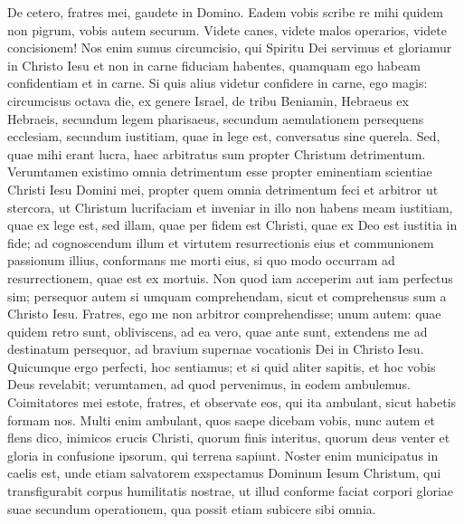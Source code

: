 \begin{biblechapter}  
\verse De cetero, fratres mei, gaudete in Domino. Eadem vobis scribe re mihi quidem non pigrum, vobis autem securum. 
\verse Videte canes, videte malos operarios, videte concisionem! 
\verse Nos enim sumus circumcisio, qui Spiritu Dei servimus et gloriamur in Christo Iesu et non in carne fiduciam habentes, 
\verse quamquam ego habeam confidentiam et in carne. Si quis alius videtur confidere in carne, ego magis: 
\verse circumcisus octava die, ex genere Israel, de tribu Beniamin, Hebraeus ex Hebraeis, secundum legem pharisaeus, 
\verse secundum aemulationem persequens ecclesiam, secundum iustitiam, quae in lege est, conversatus sine querela. 
\verse Sed, quae mihi erant lucra, haec arbitratus sum propter Christum detrimentum. 
\verse Verumtamen existimo omnia detrimentum esse propter eminentiam scientiae Christi Iesu Domini mei, propter quem omnia detrimentum feci et arbitror ut stercora, ut Christum lucrifaciam 
\verse et inveniar in illo non habens meam iustitiam, quae ex lege est, sed illam, quae per fidem est Christi, quae ex Deo est iustitia in fide; 
\verse ad cognoscendum illum et virtutem resurrectionis eius et communionem passionum illius, conformans me morti eius, 
\verse si quo modo occurram ad resurrectionem, quae est ex mortuis. 
\verse Non quod iam acceperim aut iam perfectus sim; persequor autem si umquam comprehendam, sicut et comprehensus sum a Christo Iesu. 
\verse Fratres, ego me non arbitror comprehendisse; unum autem: quae quidem retro sunt, obliviscens, ad ea vero, quae ante sunt, extendens me 
\verse ad destinatum persequor, ad bravium supernae vocationis Dei in Christo Iesu. 
\verse Quicumque ergo perfecti, hoc sentiamus; et si quid aliter sapitis, et hoc vobis Deus revelabit; 
\verse verumtamen, ad quod pervenimus, in eodem ambulemus. 
\verse Coimitatores mei estote, fratres, et observate eos, qui ita ambulant, sicut habetis formam nos. 
\verse Multi enim ambulant, quos saepe dicebam vobis, nunc autem et flens dico, inimicos crucis Christi, 
\verse quorum finis interitus, quorum deus venter et gloria in confusione ipsorum, qui terrena sapiunt. 
\verse Noster enim municipatus in caelis est, unde etiam salvatorem exspectamus Dominum Iesum Christum, 
\verse qui transfigurabit corpus humilitatis nostrae, ut illud conforme faciat corpori gloriae suae secundum operationem, qua possit etiam subicere sibi omnia. 
\end{biblechapter}

